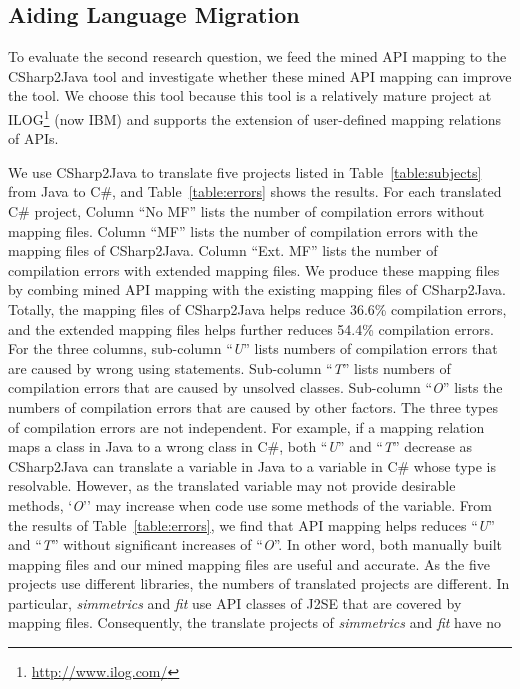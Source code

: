 \subsection{Aiding Language Migration}
\label{sec:experiment:migration} To evaluate the second research
question, we feed the mined API mapping to the CSharp2Java tool and
investigate whether these mined API mapping can improve the tool. We
choose this tool because this tool is a relatively mature project at
ILOG\footnote{\url{http://www.ilog.com/}} (now IBM) and supports the
extension of user-defined mapping relations of APIs.

We use CSharp2Java to translate five projects listed in
Table~\ref{table:subjects} from Java to C\#, and
Table~\ref{table:errors} shows the results. For each translated C\#
project, Column ``No MF'' lists the number of compilation errors
without mapping files. Column ``MF'' lists the number of compilation
errors with the mapping files of CSharp2Java. Column ``Ext. MF''
lists the number of compilation errors with extended mapping files.
We produce these mapping files by combing mined API mapping with the
existing mapping files of CSharp2Java. Totally, the mapping files of
CSharp2Java helps reduce 36.6\% compilation errors, and the extended
mapping files helps further reduces 54.4\% compilation errors. For
the three columns, sub-column ``\emph{U}'' lists numbers of
compilation errors that are caused by wrong using statements.
Sub-column ``\emph{T}'' lists numbers of compilation errors that are
caused by unsolved classes. Sub-column ``\emph{O}'' lists the
numbers of compilation errors that are caused by other factors. The
three types of compilation errors are not independent. For example,
if a mapping relation maps a class in Java to a wrong class in C\#,
both ``\emph{U}'' and ``\emph{T}'' decrease as CSharp2Java can
translate a variable in Java to a variable in C\# whose type is
resolvable. However, as the translated variable may not provide
desirable methods, `\emph{O}'' may increase when code use some
methods of the variable. From the results of
Table~\ref{table:errors}, we find that API mapping helps reduces
``\emph{U}'' and ``\emph{T}'' without significant increases of
``\emph{O}''. In other word, both manually built mapping files and
our mined mapping files are useful and accurate. As the five
projects use different libraries, the numbers of translated projects
are different. In particular, \emph{simmetrics} and \emph{fit} use
API classes of J2SE that are covered by mapping files. Consequently,
the translate projects of \emph{simmetrics} and \emph{fit} have no
